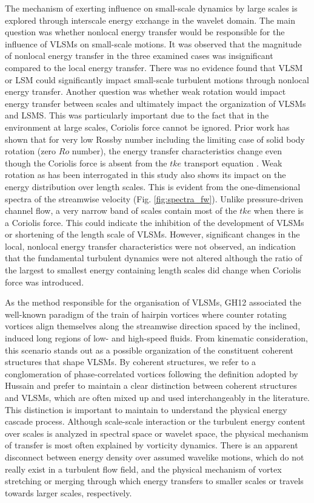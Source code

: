 The mechanism of exerting influence on small-scale dynamics by large scales is explored through interscale energy exchange in the wavelet domain. The main question was whether nonlocal energy transfer would be responsible for the influence of VLSMs on small-scale motions. It was observed that the magnitude of nonlocal energy transfer in the three examined cases was insignificant compared to the local energy transfer. There was no evidence found that VLSM or LSM could significantly impact small-scale turbulent motions through nonlocal energy transfer. Another question was whether weak rotation would impact energy transfer between scales and ultimately impact the organization of VLSMs and LSMS. This was particularly important due to the fact that in the environment at large scales, Coriolis force cannot be ignored. Prior work has shown that for very low Rossby number including the limiting case of solid body rotation (zero $Ro$ number), the energy transfer characteristics change even though the Coriolis force is absent from the $tke$ transport equation \citep{yeung_zhou_pof_98, hossain_pof_94}. Weak rotation as has been interrogated in this study also shows its impact on the energy distribution over length scales. This is evident from the one-dimensional spectra of the streamwise velocity (Fig. \ref{fig:spectra_fw}). Unlike pressure-driven channel flow, a very narrow band of scales contain most of the $tke$ when there is a Coriolis force. This could indicate the inhibition of the development of VLSMs or shortening of the length scale of VLSMs. However, significant changes in the local, nonlocal energy transfer characteristics were not observed, an indication that the fundamental turbulent dynamics were not altered although the ratio of the largest to smallest energy containing length scales did change when Coriolis force was introduced.

As the method responsible for the organisation of VLSMs, GH12 associated the well-known paradigm of the train of hairpin vortices where counter rotating vortices align themselves along the streamwise direction spaced by the inclined, induced long regions of low- and high-speed fluids. From kinematic consideration, this scenario stands out as a possible organization of the constituent coherent structures that shape VLSMs. By coherent structures, we refer to a conglomeration of phase-correlated vortices following the definition adopted by Hussain  \citep{hussain_1983_csreality} and prefer to maintain a clear distinction between coherent structures and VLSMs,  which are often mixed up and used interchangeably in the literature. This distinction is important to maintain to understand the physical energy cascade process. Although scale-scale interaction or the turbulent energy content over scales is analyzed in spectral space or wavelet space, the physical mechanism of transfer is most often explained by vorticity dynamics. There is an apparent disconnect between energy density over assumed wavelike motions, which do not really exist in a turbulent flow field, and the physical mechanism of vortex stretching or merging through which energy transfers to smaller scales or travels towards larger scales, respectively. 


